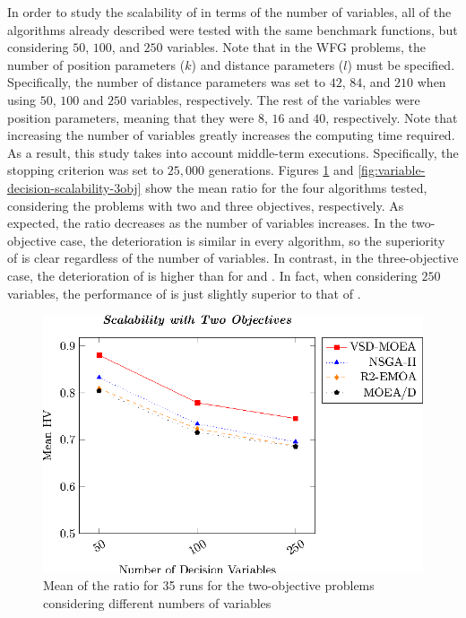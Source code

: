 In order to study the scalability of \VSDMOEA{} in terms of the number of variables, all of the algorithms already described were tested with
the same benchmark functions, but considering $50$, $100$, and $250$ variables.
%
Note that in the WFG problems, the number of position parameters ($k$) and distance parameters ($l$) must be specified.
%
Specifically, the number of distance parameters was set to $42$, $84$, and $210$ when using $50$, $100$ and $250$ variables, respectively.
%
The rest of the variables were position parameters, meaning that they were $8$, $16$ and $40$, respectively.
%
Note that increasing the number of variables greatly increases the computing time required.
%
As a result, this study takes into account middle-term executions.
%
Specifically, the stopping criterion was set to $25,000$ generations.
%
Figures \ref{fig:variable-decision-scalability-2obj} and \ref{fig:variable-decision-scalability-3obj} show the mean \HV{} ratio for the four algorithms tested,
considering the problems with two and three objectives, respectively.
%
As expected, the \HV{} ratio decreases as the number of variables increases.
%
In the two-objective case, the deterioration is similar in every algorithm, so the superiority of \VSDMOEA{} is clear regardless of the number of 
variables.
%
In contrast, in the three-objective case, the deterioration of \VSDMOEA{} is higher than for \RMOEA{} and \MOEAD{}.
%
In fact, when considering $250$ variables, the performance of \VSDMOEA{} is just slightly superior to that of \RMOEA{}.

\begin{figure}[t]
\centering
\includegraphics[scale=0.85]{Images/Graphic-Scalability-2obj_tikz-figure0.eps}
\caption{Mean of the \HV{} ratio for 35 runs for the two-objective problems considering different numbers of variables}\label{fig:variable-decision-scalability-2obj}
\end{figure}

